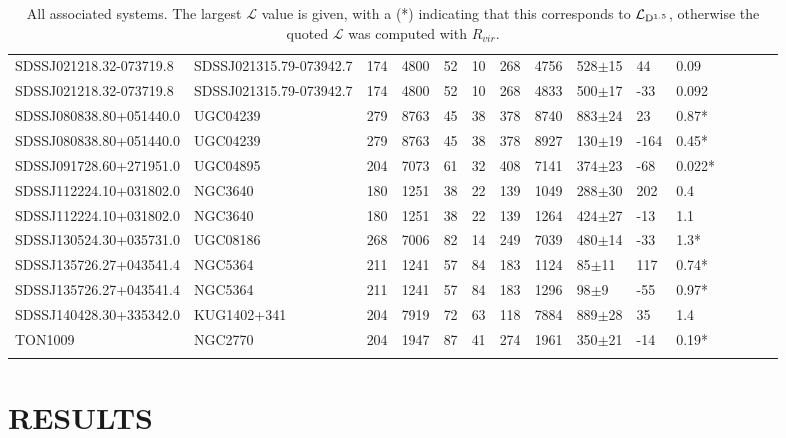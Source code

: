 \documentclass[twocolumn,tighten]{aastex6}
\begin{document}
\begin{table}[ht]
\begin{center}
\begin{tabular}{l l l l l l l l l l l l l l l}
SDSSJ021218.32-073719.8  &  SDSSJ021315.79-073942.7  &  174  &  4800  &  52  &  10  &  268  &  4756  &  528$\pm$15  &  44  &  0.09  \\
SDSSJ021218.32-073719.8  &  SDSSJ021315.79-073942.7  &  174  &  4800  &  52  &  10  &  268  &  4833  &  500$\pm$17  &  -33  &  0.092  \\
SDSSJ080838.80+051440.0  &  UGC04239  &  279  &  8763  &  45  &  38  &  378  &  8740  &  883$\pm$24  &  23  &  0.87*  \\
SDSSJ080838.80+051440.0  &  UGC04239  &  279  &  8763  &  45  &  38  &  378  &  8927  &  130$\pm$19  &  -164  &  0.45*  \\
SDSSJ091728.60+271951.0  &  UGC04895  &  204  &  7073  &  61  &  32  &  408  &  7141  &  374$\pm$23  &  -68  &  0.022*  \\
SDSSJ112224.10+031802.0  &  NGC3640  &  180  &  1251  &  38  &  22  &  139  &  1049  &  288$\pm$30  &  202  &  0.4  \\
SDSSJ112224.10+031802.0  &  NGC3640  &  180  &  1251  &  38  &  22  &  139  &  1264  &  424$\pm$27  &  -13  &  1.1  \\
SDSSJ130524.30+035731.0  &  UGC08186  &  268  &  7006  &  82  &  14  &  249  &  7039  &  480$\pm$14  &  -33  &  1.3*  \\
SDSSJ135726.27+043541.4  &  NGC5364  &  211  &  1241  &  57  &  84  &  183  &  1124  &  85$\pm$11  &  117  &  0.74*  \\
SDSSJ135726.27+043541.4  &  NGC5364  &  211  &  1241  &  57  &  84  &  183  &  1296  &  98$\pm$9  &  -55  &  0.97*  \\
SDSSJ140428.30+335342.0  &  KUG1402+341  &  204  &  7919  &  72  &  63  &  118  &  7884  &  889$\pm$28  &  35  &  1.4  \\
TON1009  &  NGC2770  &  204  &  1947  &  87  &  41  &  274  &  1961  &  350$\pm$21  &  -14  &  0.19*  \\

 \\
\hline
\end{tabular}
\end{center}
  \caption{\small{All associated systems. The largest $\mathcal{L}$ value is given, with a (\**) indicating that this corresponds to $\mathcal{L}_{\rm D^{1.5}}$, otherwise the quoted $\mathcal{L}$ was computed with $R_{vir}$.}}
  \label{target_table}
\end{table}


\section{RESULTS}
\end{document}
